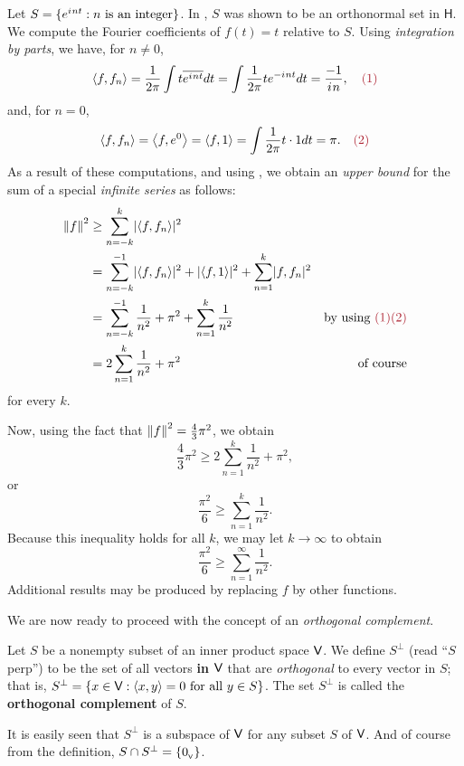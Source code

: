 \begin{example} \label{example 6.2.7}
Let \(S = \{ e^{{i\mkern1mu} n t} : n \text{ is an integer} \}\).
In , \(S\) was shown to be an orthonormal set in \(\textsf{H}\).
We compute the Fourier coefficients of \(f(t) = t\) relative to \(S\).
Using \emph{integration by parts}, we have, for \(n \ne 0\),
\[
    \LG f, f_n \RG = \frac{1}{2\pi} \int t \conjugatet{e^{\iu n t}} dt = \int \frac{1}{2\pi} t e^{-\iu n t} dt = \frac{-1}{\iu n}, \quad \MAROON{(1)}
\]
and, for \(n = 0\),
\[
    \LG f, f_n \RG = \LG f, e^0 \RG = \LG f, 1 \RG = \int \frac{1}{2\pi} t \cdot 1 dt = \pi. \quad \MAROON{(2)}
\]
As a result of these computations, and using , we obtain an \emph{upper bound} for the sum of a special \emph{infinite series} as follows:
\begin{align*}
    \norm{f}^2 & \ge \sum_{n = -k}^k \abs{ \LG f, f_n \RG }^2 \\
        & = \sum_{n = -k}^{-1} \abs{ \LG f, f_n \RG }^2 + \abs{ \LG f, 1 \RG }^2 + \sum_{n = 1}^k \abs{f, f_n}^2 \\
        & = \sum_{n = -k}^{-1} \frac{1}{n^2} + \pi^2 + \sum_{n = 1}^k \frac{1}{n^2} & \text{by using \MAROON{(1)(2)}} \\
        & = 2 \sum_{n = 1}^k \frac{1}{n^2} + \pi^2 & \text{of course}
\end{align*}
for every \(k\).

Now, using the fact that \(\left\lVert f\right\rVert^2 = \frac{4}{3}\pi^2\), we obtain
\[
    \frac{4}{3}\pi^2 \ge 2 \sum_{n = 1}^k \frac{1}{n^2} + \pi^2,
\]
or
\[
    \frac{\pi^2}{6} \ge \sum_{n = 1}^k \frac{1}{n^2}.
\]
Because this inequality holds for all \(k\), we may let \(k \to \infty\) to obtain
\[
    \frac{\pi^2}{6} \ge \sum_{n = 1}^{\infty} \frac{1}{n^2}.
\]
Additional results may be produced by replacing \(f\) by other functions.
\end{example}

We are now ready to proceed with the concept of an \emph{orthogonal complement}.

\begin{definition} \label{def 6.7}
Let \(S\) be a nonempty subset of an inner product space \(\textsf{V}\).
We define \(S^{\perp}\) (read ``\(S\) perp'') to be the set of all vectors \textbf{in \(\textsf{V}\)} that are \emph{orthogonal} to every vector in \(S\);
that is, \(S^{\perp} = \{ x \in \textsf{V}: \left< x, y \right> = 0 \text{ for all } y \in S\}\).
The set \(S^{\perp}\) is called the \textbf{orthogonal complement} of \(S\).

It is easily seen that \(S^{\perp}\) is a subspace of \(\textsf{V}\) for any subset \(S\) of \(\textsf{V}\).
And of course from the definition, \(S \cap S^{\perp} = \{ 0_{_{\textsf{V}}} \}\).
\end{definition}

